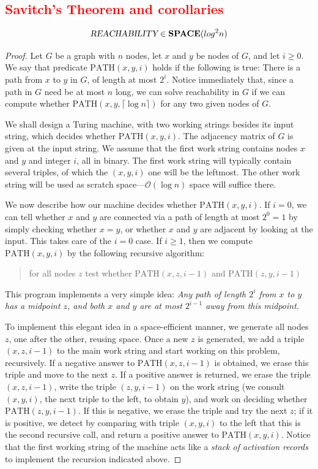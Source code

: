 \documentclass[12pt]{article}
\begin{document}
\subsection{\textcolor{red}{Savitch's Theorem and corollaries}}
\begin{defbox}[\textcolor{red}{Savitch's Theorem}]
  $$\textsl{REACHABILITY}\in\textbf{SPACE}(log^2n)$$
\end{defbox}
\begin{proof}
  Let $G$ be a graph with $n$ nodes, let $x$ and $y$ be nodes of $G$, and let $i \geq 0$. We say that predicate $\mathrm{PATH}(x, y, i)$ holds if the following is true: There is a path from $x$ to $y$ in $G$, of length at most $2^i$. Notice immediately that, since a path in $G$ need be at most $n$ long, we can solve reachability in $G$ if we can compute whether $\mathrm{PATH}(x, y, \lceil \log n \rceil)$ for any two given nodes of $G$.

We shall design a Turing machine, with two working strings besides its input string, which decides whether $\mathrm{PATH}(x, y, i)$. The adjacency matrix of $G$ is given at the input string. We assume that the first work string contains nodes $x$ and $y$ and integer $i$, all in binary. The first work string will typically contain several triples, of which the $(x, y, i)$ one will be the leftmost. The other work string will be used as scratch space---$\mathcal{O}(\log n)$ space will suffice there.

We now describe how our machine decides whether $\mathrm{PATH}(x, y, i)$. If $i = 0$, we can tell whether $x$ and $y$ are connected via a path of length at most $2^0 = 1$ by simply checking whether $x = y$, or whether $x$ and $y$ are adjacent by looking at the input. This takes care of the $i = 0$ case. If $i \geq 1$, then we compute $\mathrm{PATH}(x, y, i)$ by the following recursive algorithm:
\begin{quote}
    for all nodes $z$ test whether $\mathrm{PATH}(x, z, i-1)$ and $\mathrm{PATH}(z, y, i-1)$
\end{quote}
This program implements a very simple idea: \textit{Any path of length $2^i$ from $x$ to $y$ has a midpoint $z$, and both $x$ and $y$ are at most $2^{i-1}$ away from this midpoint.}

To implement this elegant idea in a space-efficient manner, we generate all nodes $z$, one after the other, reusing space. Once a new $z$ is generated, we add a triple $(x, z, i-1)$ to the main work string and start working on this problem, recursively. If a negative answer to $\mathrm{PATH}(x, z, i-1)$ is obtained, we erase this triple and move to the next $z$. If a positive answer is returned, we erase the triple $(x, z, i-1)$, write the triple $(z, y, i-1)$ on the work string (we consult $(x, y, i)$, the next triple to the left, to obtain $y$), and work on deciding whether $\mathrm{PATH}(z, y, i-1)$. If this is negative, we erase the triple and try the next $z$; if it is positive, we detect by comparing with triple $(x, y, i)$ to the left that this is the second recursive call, and return a positive answer to $\mathrm{PATH}(x, y, i)$. Notice that the first working string of the machine acts like a \textit{stack of activation records} to implement the recursion indicated above.


\end{proof}
\end{document}
